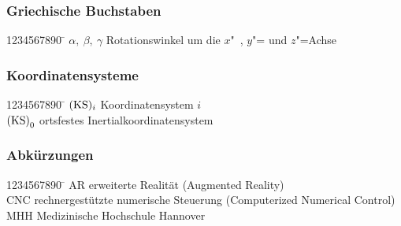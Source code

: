\subsubsection{Griechische Buchstaben}\vspace{-3mm}
\begin{tabbing}
	1234567890 \= \kill
	$\alpha, \ \beta, \ \gamma$												  \> Rotationswinkel um die $x$"~, $y$"= und $z$"=Achse                                         \\	
\end{tabbing}
\subsubsection{Koordinatensysteme}\vspace{-3mm}
\begin{tabbing}
	1234567890 \= \kill
	$({\mathrm{KS}})_{i}$							        \> Koordinatensystem $i$ \\
	${\mathrm{(KS)}}_{\mathrm{0}}$							        				\> ortsfestes Inertialkoordinatensystem \\
\end{tabbing}
\subsubsection{Abkürzungen}\vspace{-3mm}
\begin{tabbing}
	1234567890 \= \kill
	AR			\> erweiterte Realität (Augmented Reality) \\
	CNC     \> rechnergestützte numerische Steuerung (Computerized Numerical Control) \\
	MHH     \> Medizinische Hochschule Hannover \\
\end{tabbing}

